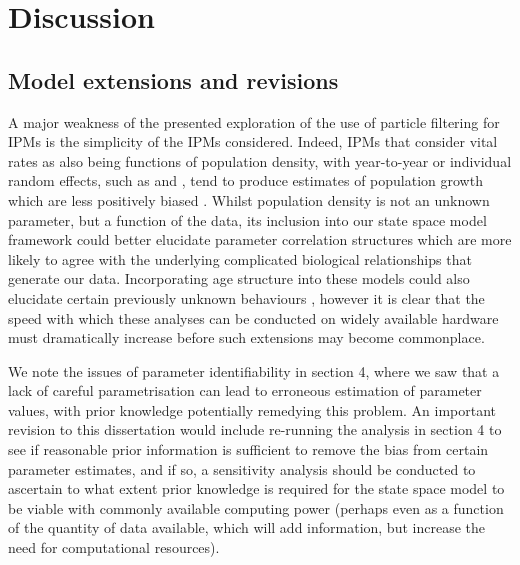 \documentclass[a4paper,12pt]{article}
\begin{document}
\newpage
\section{Discussion}

\subsection{Model extensions and revisions}
A major weakness of the presented exploration of the use of particle filtering for IPMs is the simplicity of the IPMs considered. Indeed, IPMs that consider vital rates as also being functions of population density, with year-to-year or individual random effects, such as \citet{BayesIPM} and \citet{Coulson2012}, tend to produce estimates of population growth which are less positively biased \citep{Coulson2012}. Whilst population density is not an unknown parameter, but a function of the data, its inclusion into our state space model framework could better elucidate parameter correlation structures which are more likely to agree with the underlying complicated biological relationships that generate our data. Incorporating age structure into these models could also elucidate certain previously unknown behaviours \citep{Coulson2012}, however it is clear that the speed with which these analyses can be conducted on widely available hardware must dramatically increase before such extensions may become commonplace.

We note the issues of parameter identifiability in section 4, where we saw that a lack of careful parametrisation can lead to erroneous estimation of parameter values, with prior knowledge potentially remedying this problem. An important revision to this dissertation would include re-running the analysis in section 4 to see if reasonable prior information is sufficient to remove the bias from certain parameter estimates, and if so, a sensitivity analysis should be conducted to ascertain to what extent prior knowledge is required for the state space model to be viable with commonly available computing power (perhaps even as a function of the quantity of data available, which will add information, but increase the need for computational resources).
\end{document}
